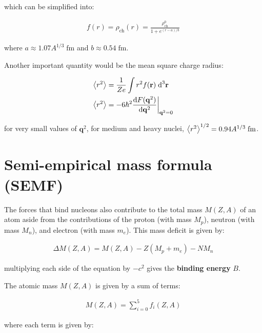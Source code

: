 \documentclass[10pt]{article}
\theoremstyle{definition}
\begin{document}
which can be simplified into:

\begin{align}
    f(r) = \rho_{\text{ch}}(r) = \frac{\rho^0_{\text{ch}}}{1+e^{(r-a)/b}}
\end{align}

where $a\approx 1.07A^{1/3}\;\text{fm}$ and $b\approx 0.54\;\text{fm}$.\newline

Another important quantity would be the mean square charge radius:

\begin{align}
    \expval{r^2} &= \frac{1}{Ze} \int r^2 f(\mathbf{r})\;\text{d}^3\mathbf{r}\\
    \expval{r^2} &= -6\hbar^2\frac{\text{d}F(\mathbf{q}^2)}{\text{d}\mathbf{q}^2}\biggr|_{\mathbf{q}^2=0}
\end{align}

for very small values of $\mathbf{q}^2$, for medium and heavy nuclei, $\expval{r^2}^{1/2} = 0.94A^{1/3}\;\text{fm}$.



\section*{Semi-empirical mass formula (SEMF)}%

The forces that bind nucleons also contribute to the total mass $M(Z,A)$ of an atom aside from the contributions of the proton (with mass $M_p$), neutron (with mass $M_n$), and electron (with mass $m_e$). This mass deficit is given by:

\begin{align}
    \Delta M(Z,A) = M(Z,A) - Z(M_p+m_e) - NM_n
\end{align}

multiplying each side of the equation by $-c^2$ gives the \textbf{binding energy} $B$. \newline

The atomic mass $M(Z,A)$ is given by a sum of terms:

\begin{align}
    M(Z,A) = \sum_{i=0}^{5} f_i(Z,A)
\end{align}

where each term is given by:
\end{document}
